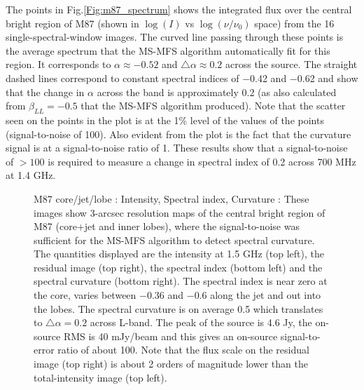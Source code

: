 \documentclass[structabstract]{stylefiles/aa}
\begin{document}
The points in Fig.\ref{Fig:m87_spectrum} shows the integrated flux over the central
bright region of M87
(shown in $\log(I)$ vs $\log(\nu/\nu_0)$ space)
from the 16 single-spectral-window images. The curved line passing through these points
is the average spectrum that the MS-MFS algorithm automatically fit for this region.
It corresponds to $\alpha \approx -0.52$ and $\triangle \alpha \approx 0.2$ across
the source. The straight dashed lines correspond to constant spectral indices of $-$0.42 and
$-$0.62 and show that the change in $\alpha$ across the band is approximately 0.2 (as also
calculated from $\beta_{LL} = -0.5$ that the MS-MFS algorithm produced).
Note that the scatter seen on the points in the plot is at the 1\% level of the
values of the points (signal-to-noise of 100). Also evident from the plot is the
fact that the curvature signal is at a signal-to-noise ratio of 1.
These results show that a signal-to-noise of $>100$ is required to measure 
a change in spectral index of 0.2 across 700 MHz at 1.4 GHz.


\begin{figure}[t!]
\begin{center}
\end{center}
\caption[M87 core/jet/lobe : Intensity, Spectral index, Curvature]
{\small M87 core/jet/lobe : Intensity, Spectral index, Curvature : 
These images show 3-arcsec resolution maps of the central bright
region of M87 (core+jet and inner lobes), where the signal-to-noise was
sufficient for the MS-MFS algorithm to detect spectral curvature.
The quantities displayed are the intensity at 1.5 GHz (top left),
the residual image (top right),
the spectral index (bottom left) and the spectral curvature (bottom right).
The spectral index is near zero at the core, varies between $-$0.36 and
$-$0.6 along the jet and out into the lobes. The spectral curvature is
on average 0.5 which translates to $\triangle\alpha=0.2$ across L-band.
The peak of the source is 4.6 Jy, the on-source RMS is 40 mJy/beam 
and this gives an on-source signal-to-error ratio of about 100.
Note that the flux scale on the residual image (top right) is about 2 orders of magnitude
lower than the total-intensity image (top left).
}
\label{Fig:m87_lobes}
\end{figure}
\end{document}
